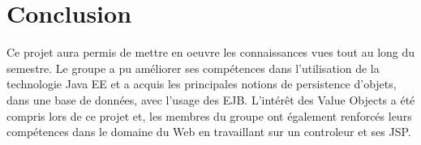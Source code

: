 \documentclass[10pt]{report}
\begin{document}
\chapter*{Conclusion}

Ce projet aura permis de mettre en oeuvre les connaissances vues tout au long du semestre. Le groupe a pu améliorer ses compétences dans l'utilisation de la technologie Java EE et a acquis les principales notions de persistence d'objets, dans une base de données, avec l'usage des EJB. L'intérêt des Value Objects a été compris lors de ce projet et, les membres du groupe ont également renforcés leurs compétences dans le domaine du Web en travaillant sur un controleur et ses JSP. 
\end{document}
